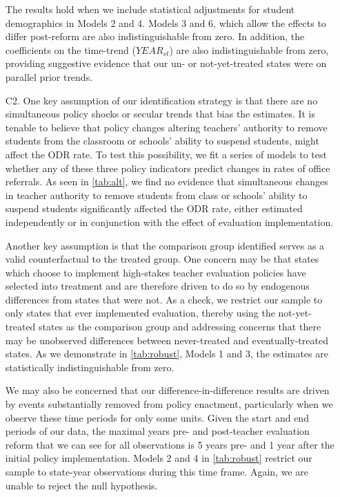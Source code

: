 \documentclass[a4paper, 11pt]{article}
\begin{document}
\begin{enumerate}
The results hold when we include statistical adjustments for student demographics in Models 2 and 4. Models 3 and 6, which allow the effects to differ post-reform are also indistinguishable from zero. In addition, the coefficients on the time-trend ($YEAR_{st}$) are also indistinguishable from zero, providing suggestive evidence that our un- or not-yet-treated states were on parallel prior trends.



	\item[C2.] One key assumption of our identification strategy is that there are no simultaneous policy shocks or secular trends that bias the estimates. It is tenable to believe that policy changes altering teachers' authority to remove students from the classroom or schools' ability to suspend students, might affect the ODR rate. To test this possibility, we fit a series of models to test whether any of these three policy indicators predict changes in rates of office referrals. As seen in \autoref{tab:alt}, we find no evidence that simultaneous changes in teacher authority to remove students from class or schools' ability to suspend students significantly affected the ODR rate, either estimated independently or in conjunction with the effect of evaluation implementation. 



Another key assumption is that the comparison group identified serves as a valid counterfactual to the treated group. One concern may be that states which choose to implement high-stakes teacher evaluation policies have selected into treatment and are therefore driven to do so by endogenous differences from states that were not. As a check, we restrict our sample to only states that ever implemented evaluation, thereby using the not-yet-treated states as the comparison group and addressing concerns that there may be unobserved differences between never-treated and eventually-treated states. As we demonstrate in \autoref{tab:robust}, Models 1 and 3, the estimates are statistically indistinguishable from zero. 

We may also be concerned that our difference-in-difference results are driven by events substantially removed from policy enactment, particularly when we observe these time periods for only some units. Given the start and end periods of our data, the maximal years pre- and post-teacher evaluation reform that we can see for all observations is 5 years pre- and 1 year after the initial policy implementation. Models 2 and 4 in \autoref{tab:robust} restrict our sample to state-year observations during this time frame. Again, we are unable to reject the null hypothesis.


\end{enumerate}
\end{document}
